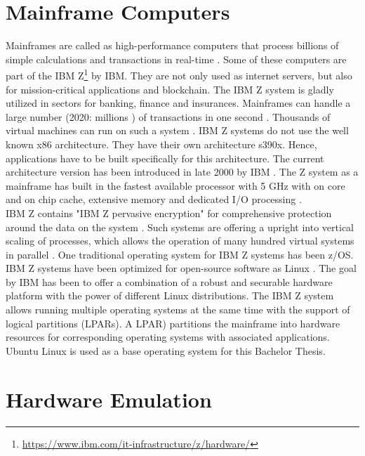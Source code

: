 \section{Mainframe Computers}

Mainframes are called as high-performance computers that process billions of simple calculations and transactions in real-time \cite{IBM}. Some of these computers are part of the IBM Z\footnote{\url{https://www.ibm.com/it-infrastructure/z/hardware/}} by IBM. They are not only used as internet servers, but also for mission-critical applications and blockchain. 
The IBM Z system is gladly utilized in sectors for banking, finance and insurances.
Mainframes can handle a large number (2020: millions \cite{IBM2}) of transactions in one second \cite[~p.56]{Tanenbaum2014}. 
Thousands of virtual machines can run on such a system \cite{OpenMainframeProject}. \gls{IBM Z systems} do not use the well known x86 architecture. 
They have their own architecture s390x. Hence, applications have to be built specifically for this architecture. 
The current architecture version has been introduced in late 2000 by IBM \cite[~p.15]{Block2019}. The Z system as a mainframe has built in the fastest available processor with 5 GHz with on core and on chip cache, extensive memory and dedicated I/O processing \cite{OpenMainframeProject}.
\\
IBM Z contains "IBM Z pervasive encryption" for comprehensive protection around the data on the system \cite[~p.4]{Lascu2020}. Such systems are offering a upright into vertical \gls{scaling} of processes, which allows the operation of many hundred virtual systems in parallel \cite[~p.13]{Tschoeke2009}. One traditional operating system for IBM Z systems has been z/OS. 
IBM Z systems have been optimized for open-source software as Linux \cite[~p.8]{Lascu2020}. The goal by IBM has been to offer a combination of a robust and securable hardware platform with the power of different Linux distributions. 
The IBM Z system allows running multiple operating systems at the same time with the support of logical partitions (LPARs).
A \gls{LPAR}) partitions the mainframe into hardware resources for corresponding operating systems with associated applications. \\
Ubuntu Linux is used as a base operating system for this Bachelor Thesis.


\section{Hardware Emulation}


